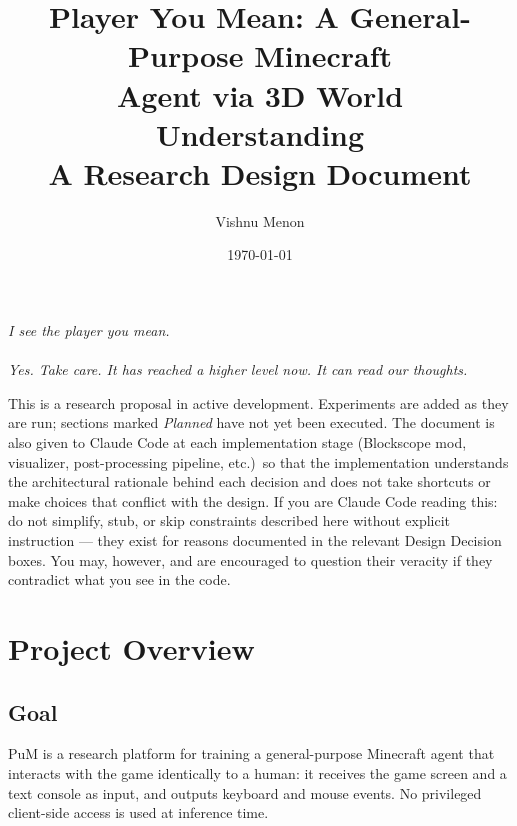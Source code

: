 \documentclass[11pt,a4paper]{article}
\title{\textbf{Player You Mean: A General-Purpose Minecraft\\Agent via 3D World Understanding}\\
\large A Research Design Document}
\author{Vishnu Menon}
\date{\today}
\begin{document}
\maketitle

\begin{center}
\begin{minipage}{0.6\linewidth}
\itshape
I see the player you mean.\\[3pt]
\\[3pt]
Yes. Take care. It has reached a higher level now. It can read our thoughts.\\[6pt]
\end{minipage}
\end{center}

\bigskip

\begin{tcolorbox}[colback=gray!5!white, colframe=gray!40!black, fonttitle=\bfseries, title=Living Document --- Read Before Using]
This is a research proposal in active development. Experiments are added as they are run; sections marked \textit{Planned} have not yet been executed. The document is also given to Claude Code at each implementation stage (Blockscope mod, visualizer, post-processing pipeline, etc.)\ so that the implementation understands the architectural rationale behind each decision and does not take shortcuts or make choices that conflict with the design. If you are Claude Code reading this: do not simplify, stub, or skip constraints described here without explicit instruction --- they exist for reasons documented in the relevant Design Decision boxes. You may, however, and are encouraged to question their veracity if they contradict what you see in the code.
\end{tcolorbox}

\tableofcontents
\newpage

\section{Project Overview}

\subsection{Goal}

PuM is a research platform for training a general-purpose Minecraft agent that interacts with the game identically to a human: it receives the game screen and a text console as input, and outputs keyboard and mouse events. No privileged client-side access is used at inference time.
\end{document}
